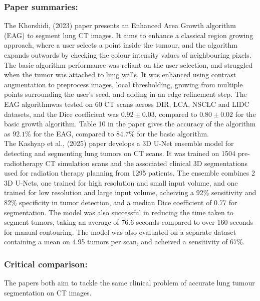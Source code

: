 \documentclass[11pt, a4paper]{article}
\begin{document}
\subsubsection{Paper summaries:}

\noindent The Khorshidi, (2023) paper presents an Enhanced Area Growth algorithm (EAG) to segment lung CT images. 
It aims to enhance a classical region growing approach, where a user selects a point inside the tumour, and the algorithm expands outwards by checking the colour intensity values of neighbouring pixels. 
The basic algorithm performance was reliant on the user selection, and struggled when the tumor was attached to lung walls. 
It was enhanced using contrast augmentation to preprocess images, local thresholding, growing from multiple points surrounding the user's seed, and adding in an edge refinement step. 
The EAG algorithmwas tested on 60 CT scans across DIR, LCA, NSCLC and LIDC datasets, and the Dice coefficient was $0.92 \pm 0.03$, compared to $0.80 \pm 0.02$ for the basic growth algorithm. 
Table 10 in the paper gives the accuracy of the algorithm as $92.1\%$ for the EAG, compared to $84.7\%$ for the basic algorithm.\\

\noindent The Kashyap et al., (2025) paper develops a 3D U-Net ensemble model for detecting and segmenting lung tumors on CT scans. 
It was trained on 1504 pre-radiotherapy CT simulation scans and the associated clinical 3D segmentations used for radiation therapy planning from 1295 patients. 
The ensemble combines 2 3D U-Nets, one trained for high resolution and small input volume, and one trained for low resolution and large input volume, acheiving a 92\% sensitivity and 82\% specificity in tumor detection, and a median Dice coefficient of 0.77 for segmentation. 
The model was also successful in reducing the time taken to segment tumors, taking an average of 76.6 seconds compared to over 160 seconds for manual contouring. 
The model was also evaluated on a separate dataset containing a mean on 4.95 tumors per scan, and acheived a sensitivity of 67\%.

\newpage

\subsubsection{Critical comparison:}

\noindent The papers both aim to tackle the same clinical problem of accurate lung tumour segmentation on CT images. \\
\end{document}
